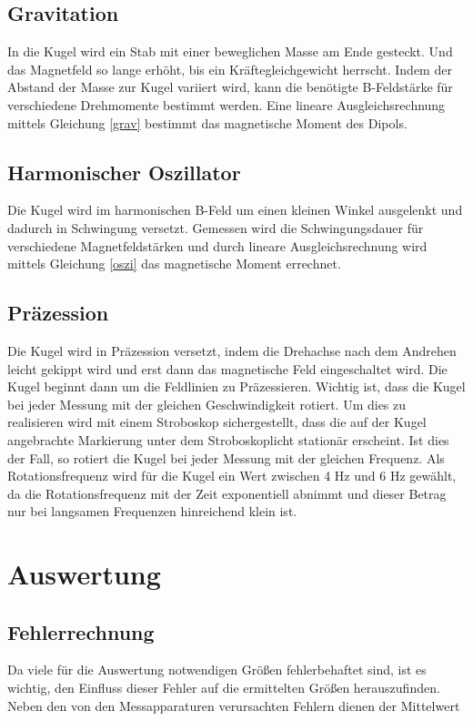\subsection{Gravitation}
In die Kugel wird ein Stab mit einer beweglichen Masse am Ende gesteckt. Und das Magnetfeld so lange erhöht, bis ein Kräftegleichgewicht herrscht. Indem der Abstand der Masse zur Kugel variiert wird, kann die benötigte B-Feldstärke für verschiedene Drehmomente bestimmt werden. Eine lineare Ausgleichsrechnung mittels Gleichung \eqref{grav} bestimmt das magnetische Moment des Dipols.
\subsection{Harmonischer Oszillator}
Die Kugel wird im harmonischen B-Feld um einen kleinen Winkel ausgelenkt und dadurch in Schwingung versetzt.
Gemessen wird die Schwingungsdauer für verschiedene Magnetfeldstärken und durch lineare Ausgleichsrechnung wird mittels Gleichung \eqref{oszi} das magnetische Moment errechnet.
\subsection{Präzession}
Die Kugel wird in Präzession versetzt, indem die Drehachse nach dem Andrehen leicht gekippt wird und erst dann das magnetische Feld eingeschaltet wird. Die Kugel beginnt dann um die Feldlinien zu Präzessieren. Wichtig ist, dass die Kugel bei jeder Messung mit der gleichen Geschwindigkeit rotiert. Um dies zu realisieren wird mit einem Stroboskop sichergestellt, dass die auf der Kugel angebrachte Markierung unter dem Stroboskoplicht stationär erscheint. Ist dies der Fall, so rotiert die Kugel bei jeder Messung mit der gleichen Frequenz. Als Rotationsfrequenz wird für die Kugel ein Wert zwischen 4 Hz und 6 Hz gewählt, da die Rotationsfrequenz mit der Zeit exponentiell abnimmt und dieser Betrag nur bei langsamen Frequenzen hinreichend klein ist.  

\section{Auswertung}
\subsection{Fehlerrechnung}
Da viele für die Auswertung notwendigen Größen fehlerbehaftet sind, ist es wichtig, den Einfluss dieser Fehler auf die ermittelten
Größen herauszufinden. Neben den von den Messapparaturen verursachten Fehlern dienen der Mittelwert

